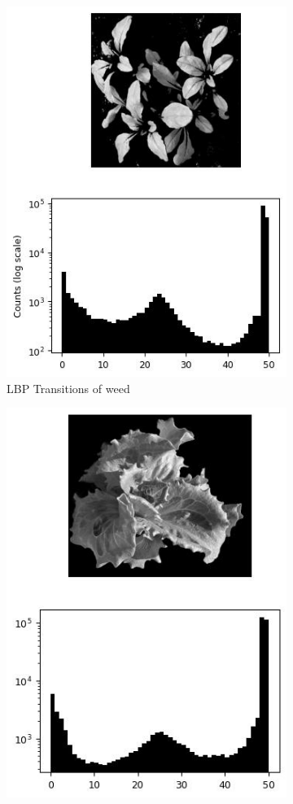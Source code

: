 \documentclass[letterpaper]{report}
\begin{document}
\begin{figure}[H]
	\centering
	\begin{subfigure}{0.48\linewidth}
		\centering
		\includegraphics[scale=.5]{./figures/lbp-left.jpg}
		\caption{LBP Transitions of weed}
		\label{subfig:lbp-weed}	
	\end{subfigure}
	\hfill
	\begin{subfigure}{0.48\linewidth}
		\centering
		\includegraphics[scale=.5]{./figures/lbp-right.jpg}

\end{subfigure}
\end{figure}
\end{document}
